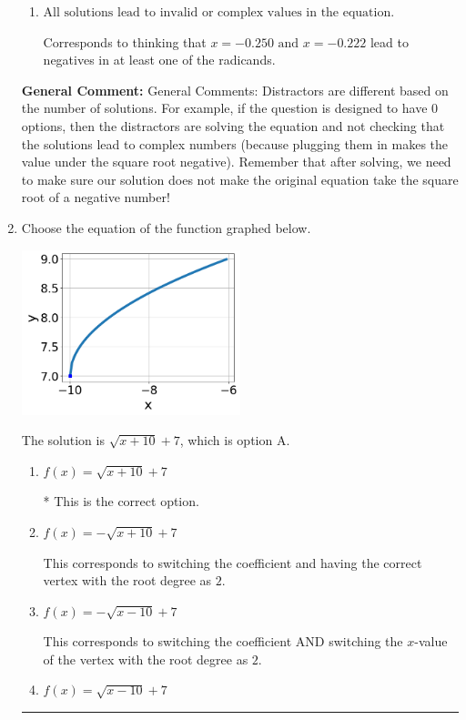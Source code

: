 \documentclass{extbook}[14pt]
\newcommand{\litem}[1]{\item #1

\rule{\textwidth}{0.4pt}}
\begin{document}
\begin{enumerate}
{\begin{enumerate}[label=\Alph*.]
* $x = -0.250 \text{ and } x = -0.222$, which is the correct option.
\item \( \text{All solutions lead to invalid or complex values in the equation.} \)

Corresponds to thinking that $x = -0.250 \text{ and } x = -0.222$ lead to negatives in at least one of the radicands.
\end{enumerate}

\textbf{General Comment:} General Comments: Distractors are different based on the number of solutions. For example, if the question is designed to have 0 options, then the distractors are solving the equation and not checking that the solutions lead to complex numbers (because plugging them in makes the value under the square root negative). Remember that after solving, we need to make sure our solution does not make the original equation take the square root of a negative number!
}
\litem{
Choose the equation of the function graphed below.

\begin{center}
    \includegraphics[width=0.5\textwidth]{../Figures/radicalGraphToEquationCopyA.png}
\end{center}



The solution is \( \sqrt{x + 10} + 7 \), which is option A.\begin{enumerate}[label=\Alph*.]
\item \( f(x) = \sqrt{x + 10} + 7 \)

* This is the correct option.
\item \( f(x) = - \sqrt{x + 10} + 7 \)

This corresponds to switching the coefficient and having the correct vertex with the root degree as $2$.
\item \( f(x) = - \sqrt{x - 10} + 7 \)

This corresponds to switching the coefficient AND switching the $x$-value of the vertex with the root degree as $2$.
\item \( f(x) = \sqrt{x - 10} + 7 \)


\end{enumerate}}
\end{enumerate}
\end{document}
